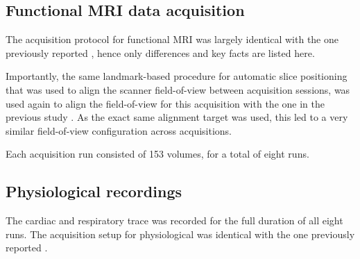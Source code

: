 \subsection*{Functional MRI data acquisition}

The acquisition protocol for functional MRI was largely identical with the one
previously reported \cite{Hanke_2014}, hence only differences and key facts are
listed here.

Importantly, the same landmark-based procedure for automatic slice positioning
that was used to align the scanner field-of-view between acquisition sessions,
was used again to align the field-of-view for this acquisition with the one in
the previous study \cite{Hanke_2014}. As the exact same alignment target was
used, this led to a very similar field-of-view configuration across
acquisitions.

Each acquisition run consisted of 153 volumes, for a total of eight runs.

\subsection*{Physiological recordings}

The cardiac and respiratory trace was recorded for the full duration of all
eight runs. The acquisition setup for physiological was identical with the one
previously reported \cite{Hanke_2014}.
